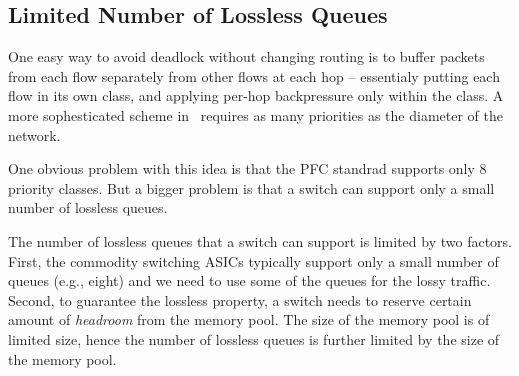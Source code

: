 {%


\subsection{Limited Number of Lossless Queues}
\label{subsec:pfcheadroom}

One easy way to avoid deadlock without changing routing is to buffer packets
from each flow separately from other flows at each hop -- essentialy putting
each flow in its own class, and applying per-hop backpressure only within the
class.  A more sophesticated scheme in~\cite{karol2003prevention} requires as
many priorities as the diameter of the network. 

One obvious problem with this idea is that the PFC standrad supports only 8
priority classes. But a bigger problem is that a switch can support only a small
number of lossless queues.

The number of lossless queues that a switch can support is limited by two
factors. First, the commodity switching ASICs typically support only a small
number of queues (e.g., eight) and we need to use some of the queues for the
lossy traffic. Second, to guarantee the lossless property, a switch needs to
reserve certain amount of {\it headroom} from the memory pool. The size of the
memory pool is of limited size, hence the number of lossless queues is further
limited by the size of the memory pool.

}
